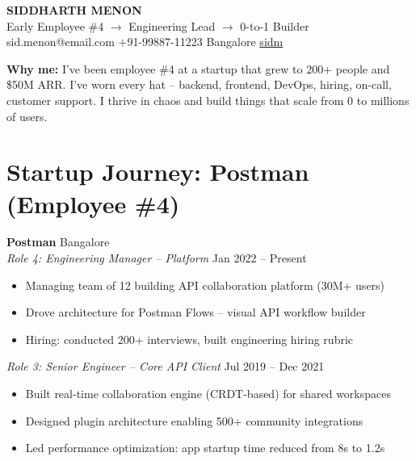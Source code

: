 \documentclass[10pt,letterpaper]{article}
\begin{document}
\noindent{}

\vspace{0.2cm}
\begin{center}
{\LARGE\bfseries SIDDHARTH MENON}\\[3pt]
{\normalsize Early Employee \#4 $\rightarrow$ Engineering Lead $\rightarrow$ 0-to-1 Builder}\\[4pt]
{\small {} sid.menon@email.com \quad {} +91-99887-11223 \quad {} Bangalore \quad {} \href{https://github.com/sidm}{sidm}}
\end{center}

\vspace{4pt}
\begin{tcolorbox}
\textbf{Why me:} I've been employee \#4 at a startup that grew to 200+ people and \$50M ARR. I've worn every hat -- backend, frontend, DevOps, hiring, on-call, customer support. I thrive in chaos and build things that scale from 0 to millions of users.
\end{tcolorbox}

\section{Startup Journey: Postman (Employee \#4)}

\textbf{Postman} \hfill Bangalore\\[2pt]
\textit{\color{startorange}Role 4: Engineering Manager -- Platform} \hfill Jan 2022 -- Present
\begin{itemize}
\item Managing team of 12 building API collaboration platform (30M+ users)
\item Drove architecture for Postman Flows -- visual API workflow builder
\item Hiring: conducted 200+ interviews, built engineering hiring rubric
\end{itemize}

\textit{\color{startorange}Role 3: Senior Engineer -- Core API Client} \hfill Jul 2019 -- Dec 2021
\begin{itemize}
\item Built real-time collaboration engine (CRDT-based) for shared workspaces
\item Designed plugin architecture enabling 500+ community integrations
\item Led performance optimization: app startup time reduced from 8s to 1.2s
\end{itemize}
\end{document}
